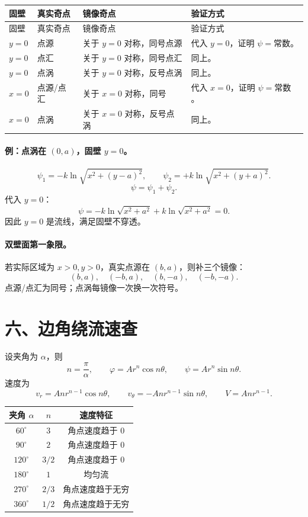 \documentclass[10.5pt,a4paper]{ctexart}
\begin{document}
\small
\begin{longtable}{>{\centering\arraybackslash}p{2.6cm}
>{\centering\arraybackslash}p{3.0cm}
>{\centering\arraybackslash}p{4.4cm}
>{\raggedright\arraybackslash}p{6.4cm}}
\toprule
固壁 & 真实奇点 & 镜像奇点 & 验证方式\\
\midrule
\endfirsthead
\toprule
固壁 & 真实奇点 & 镜像奇点 & 验证方式\\
\midrule
\endhead

$y=0$ & 点源 & 关于 $y=0$ 对称，同号点源 & 代入 $y=0$，证明 $\psi=\text{常数}$。\\
$y=0$ & 点汇 & 关于 $y=0$ 对称，同号点汇 & 同上。\\
$y=0$ & 点涡 & 关于 $y=0$ 对称，反号点涡 & 同上。\\
$x=0$ & 点源/点汇 & 关于 $x=0$ 对称，同号 & 代入 $x=0$，证明 $\psi=\text{常数}$。\\
$x=0$ & 点涡 & 关于 $x=0$ 对称，反号点涡 & 同上。\\
\bottomrule
\end{longtable}
\normalsize

\paragraph{例：点涡在 $(0,a)$，固壁 $y=0$。}
\[
\psi_1=-k\ln\sqrt{x^2+(y-a)^2},\qquad
\psi_2=+k\ln\sqrt{x^2+(y+a)^2}.
\]
\[
\psi=\psi_1+\psi_2.
\]
代入 $y=0$：
\[
\psi=-k\ln\sqrt{x^2+a^2}+k\ln\sqrt{x^2+a^2}=0.
\]
因此 $y=0$ 是流线，满足固壁不穿透。

\paragraph{双壁面第一象限。}
若实际区域为 $x>0,y>0$，真实点源在 $(b,a)$，则补三个镜像：
\[
(b,a),\quad (-b,a),\quad (b,-a),\quad (-b,-a).
\]
点源/点汇为同号；点涡每镜像一次换一次符号。

\section*{六、边角绕流速查}

设夹角为 $\alpha$，则
\[
n=\frac{\pi}{\alpha},\qquad
\varphi=A r^n\cos n\theta,\qquad
\psi=A r^n\sin n\theta.
\]
速度为
\[
v_r=Anr^{n-1}\cos n\theta,\qquad
v_\theta=-Anr^{n-1}\sin n\theta,\qquad
V=Anr^{n-1}.
\]

\small
\begin{center}
\begin{tabular}{ccc}
\toprule
夹角 $\alpha$ & $n$ & 速度特征\\
\midrule
$60^\circ$ & $3$ & 角点速度趋于 $0$\\
$90^\circ$ & $2$ & 角点速度趋于 $0$\\
$120^\circ$ & $3/2$ & 角点速度趋于 $0$\\
$180^\circ$ & $1$ & 均匀流\\
$270^\circ$ & $2/3$ & 角点速度趋于无穷\\
$360^\circ$ & $1/2$ & 角点速度趋于无穷\\
\bottomrule
\end{tabular}
\end{center}
\normalsize
\end{document}
